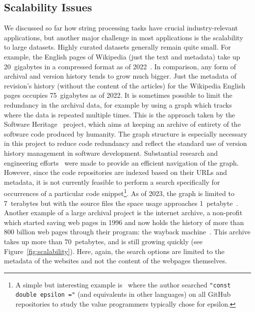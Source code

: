 \subsection{Scalability Issues}\label{sec:intro:scalability}

 
We discussed so far how string processing tasks have crucial industry-relevant applications, but another major challenge in most applications is the scalability to large datasets.
Highly curated datasets generally remain quite small. For example, the English pages of Wikipedia (just the text and metadata) take up 20~gigabytes in a compressed format as of 2022~\cite{wikimedia}. In comparison, any form of archival and version history tends to grow much bigger. Just the metadata of revision's history (without the content of the articles) for the Wikipedia English pages occupies 75~gigabytes as of 2022.
It is sometimes possible to limit the redundancy in the archival data, for example by using a graph which tracks where the data is repeated multiple times. This is the approach taken by the Software Heritage~\cite{swh-site} project, which aims at keeping an archive of entirety of the software code produced by humanity. The graph structure is especially necessary in this project to reduce code redundancy and reflect the standard use of version history management in software development.
Substantial research and engineering efforts~\cite{DBLP:phd/hal/Pietri21} were made to provide an efficient navigation of the graph. 
However, since the code repositories are indexed based on their URLs and metadata, it is not currently feasible to perform a search specifically for occurrences of a particular code snippet\footnote{\setlength\parindent{10pt} A simple but interesting example is~\cite{vii2014if} where the author searched \texttt{"const double epsilon ="} (and equivalents in other languages) on all GitHub repositories to study the value programmers typically chose for epsilon.}.
As of 2023, the graph is limited to 7~terabytes but with the source files the space usage approaches 1~petabyte~\cite{swh-polytechnique}.
Another example of a large archival project is the internet archive, a non-profit which started saving web pages in 1996 and now holds the history of more than 800 billion web pages through their program: the wayback machine~\cite{web-archive}. This archive takes up more than 70~petabytes, and is still growing quickly (see Figure~\ref{fig:scalability}).
Here, again, the search options are limited to the metadata of the websites and not the content of the webpages themselves.


